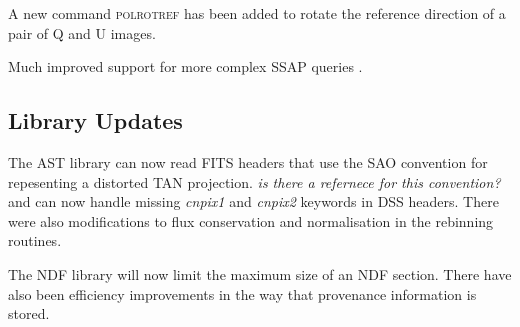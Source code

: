 \documentclass[11pt,twoside]{article}
\begin{document}

A new command \textsc{polrotref} has been added to rotate the
reference direction of a pair of Q and U images.


Much improved support for more complex SSAP queries \citep[see][for a
protocol introduction]{2004SPIE.5493..262D}.

\subsection*{Library Updates}


The AST library \citep[see][and references
therein]{2012ASPC..461..825B} can now read FITS headers that use the
SAO convention for repesenting a distorted TAN projection. \textit{is
  there a refernece for this convention?} and can now handle missing
\textit{cnpix1} and \textit{cnpix2} keywords in DSS headers. There
were also modifications to flux conservation and normalisation in the
rebinning routines.


The NDF library will now limit the maximum size of an NDF
section. There have also been efficiency improvements in the way that
provenance information is stored.


\end{document}
